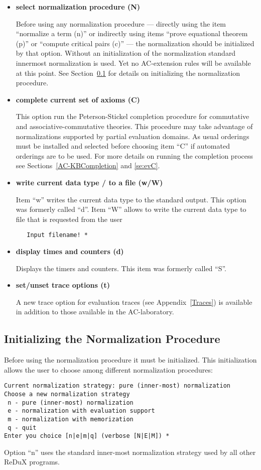\begin{itemize}
\item \textbf{select normalization procedure (N)}

 Before using any normalization procedure --- directly using the item 
 ``normalize a term (n)''
 or indirectly using items ``prove equational theorem (p)'' or 
 ``compute critical pairs (c)'' --- the normalization should be initialized 
 by that option. 
 Without an initialization of the normalization standard innermost 
 normalization is used. Yet no AC-extension rules will be available
 at this point. 
 See Section~\ref{se:evN} for details on initializing the normalization
 procedure.
\item \textbf{complete current set of axioms (C)}

 This option run the Peterson-Stickel completion procedure for
 commutative and associative-commutative theories.
 This procedure may take advantage of normalizations supported by
 partial evaluation domains.
 As usual orderings must be installed and selected before choosing
 item ``C'' if automated orderings are to be used.
 For more details on running the completion process see  
 Sections~\ref{AC-KBCompletion} and \ref{se:evC}.
\item \textbf{write current data type / to a file (w/W)}

 Item ``w'' writes the current data type to the standard output.
 This option was formerly called ``d''.
 Item ``W'' allows to write  the current data type to file that is requested
 from the user
\begin{verbatim}
   Input filename! *
\end{verbatim}
\item \textbf{display times and counters (d)}

 Displays the timers and counters. This item was formerly called ``S''.
\item \textbf{set/unset trace options (t)}

 A new trace option for evaluation traces (see Appendix~\ref{Traces})
 is available in addition to those
 available in the AC-laboratory.

\end{itemize}

\subsection{Initializing the Normalization Procedure}
\label{se:evN}

Before using the normalization procedure it must be initialized.
This initialization allows the user to choose among different normalization
procedures:
\begin{verbatim}
Current normalization strategy: pure (inner-most) normalization
Choose a new normalization strategy
 n - pure (inner-most) normalization
 e - normalization with evaluation support
 m - normalization with memorization
 q - quit
Enter you choice [n|e|m|q] (verbose [N|E|M]) *
\end{verbatim}
Option ``n'' uses the standard inner-most normalization strategy used
by all other ReDuX programs.

